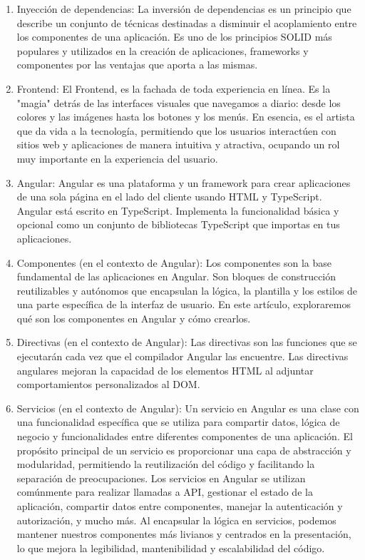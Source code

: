 \begin{enumerate}
    \item Inyección de dependencias: La inversión de dependencias es un principio que describe un conjunto de técnicas destinadas a disminuir el acoplamiento entre los componentes de una aplicación. Es uno de los principios SOLID más populares y utilizados en la creación de aplicaciones, frameworks y componentes por las ventajas que aporta a las mismas.\citep{campusmvpInyeccinDependencias}
    \item Frontend: El Frontend, es la fachada de toda experiencia en línea. Es la "magia" detrás de las interfaces visuales que navegamos a diario: desde los colores y las imágenes hasta los botones y los menús. En esencia, es el artista que da vida a la tecnología, permitiendo que los usuarios interactúen con sitios web y aplicaciones de manera intuitiva y atractiva, ocupando un rol muy importante en la experiencia del usuario.\citep{linkedinFrontendCaractersticas}
    \item Angular: Angular es una plataforma y un framework para crear aplicaciones de una sola página en el lado del cliente usando HTML y TypeScript. Angular está escrito en TypeScript. Implementa la funcionalidad básica y opcional como un conjunto de bibliotecas TypeScript que importas en tus aplicaciones.\citep{angularAngular}
    \item Componentes (en el contexto de Angular): Los componentes son la base fundamental de las aplicaciones en Angular. Son bloques de construcción reutilizables y autónomos que encapsulan la lógica, la plantilla y los estilos de una parte específica de la interfaz de usuario. En este artículo, exploraremos qué son los componentes en Angular y cómo crearlos.\citep{QuComponentes}
    \item Directivas (en el contexto de Angular): Las directivas son las funciones que se ejecutarán cada vez que el compilador Angular las encuentre. Las directivas angulares mejoran la capacidad de los elementos HTML al adjuntar comportamientos personalizados al DOM.\citep{freecodecampCmoUsar}
    \item Servicios (en el contexto de Angular): Un servicio en Angular es una clase con una funcionalidad específica que se utiliza para compartir datos, lógica de negocio y funcionalidades entre diferentes componentes de una aplicación. El propósito principal de un servicio es proporcionar una capa de abstracción y modularidad, permitiendo la reutilización del código y facilitando la separación de preocupaciones.
    Los servicios en Angular se utilizan comúnmente para realizar llamadas a API, gestionar el estado de la aplicación, compartir datos entre componentes, manejar la autenticación y autorización, y mucho más. Al encapsular la lógica en servicios, podemos mantener nuestros componentes más livianos y centrados en la presentación, lo que mejora la legibilidad, mantenibilidad y escalabilidad del código.\citep{imaginaformacionCmoIntegrar}

\end{enumerate}
